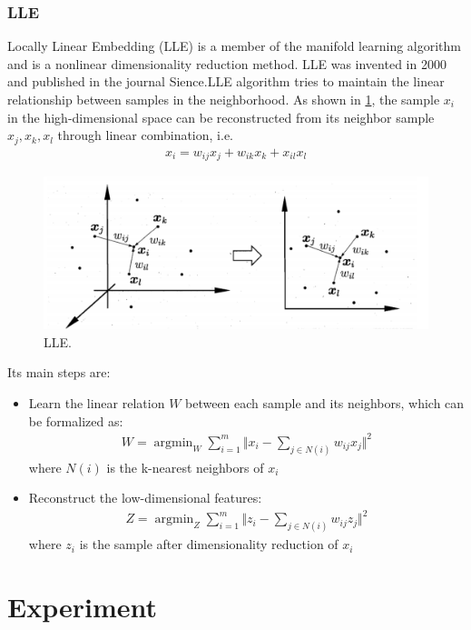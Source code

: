 \documentclass{article}
\begin{document}
\subsubsection{LLE}
Locally Linear Embedding (LLE) is a member of the manifold learning algorithm and is a nonlinear dimensionality reduction method. LLE was invented in 2000 and published in the journal Sience.\cite{roweis2000nonlinear}LLE algorithm tries to maintain the linear relationship between samples in the neighborhood. As shown in \ref{fig:LLE}, the sample $x_i$ in the high-dimensional space can be reconstructed from its neighbor sample $x_j,x_k,x_l$ through linear combination, i.e.
\begin{eqnarray}
x_i = w_{ij}x_j+w_{ik}x_k+x_{il}x_l
\end{eqnarray}
\begin{figure}[htbp]
	\centering
	\includegraphics[scale=0.3]{figure/LLE.png}
	\caption{LLE.}
	\label{fig:LLE}
\end{figure}\par
\indent Its main steps are:
\begin{itemize}
	\item Learn the linear relation $W$ between each sample and its neighbors, which can be formalized as:
	\begin{eqnarray}
	W = \mathop{\arg\min}_{W}\sum_{i=1}^{m}\Vert x_i-\sum_{j\in N(i)}w_{ij}x_j\Vert^2 
	\end{eqnarray}
	where $N(i)$ is the k-nearest neighbors of $x_i$
	
	\item  Reconstruct the low-dimensional features:
	\begin{eqnarray}
	Z = \mathop{\arg\min}_{Z}\sum_{i=1}^{m}\Vert z_i-\sum_{j\in N(i)}w_{ij}z_j\Vert^2 
	\end{eqnarray}
	where $z_i$ is the sample after dimensionality reduction of $x_i$
\end{itemize}

\section{Experiment}
\end{document}
